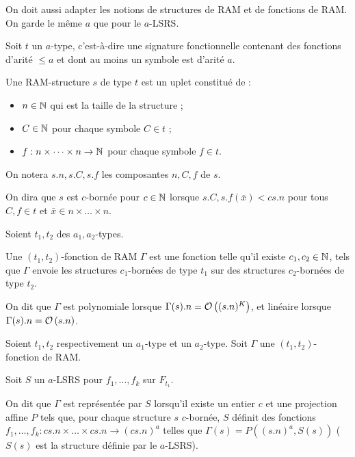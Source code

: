 \documentclass{report}
\begin{document}
		On doit aussi adapter les notions de structures de RAM et de fonctions de RAM. On garde le même $a$ que pour le $a$-LSRS.
		
		\begin{definition}
			\label{def:RAM_data_structures_a}
			Soit $t$ un $a$-type, c'est-à-dire une signature fonctionnelle contenant des fonctions d'arité $\leqslant a$ et dont au moins un symbole est d'arité $a$. 
			
			Une RAM-structure $s$ de type $t$ est un uplet constitué de :
			\begin{itemize}[itemsep=-1mm]
				\item 	$n \in \mathbb{N}$ qui est la taille de la structure ;
				\item 	$C \in \mathbb{N}$ pour chaque symbole $C \in t$ ;
				\item 	$f : n\times \dots \times n \to \mathbb{N}$ pour chaque symbole $f \in t$.
			\end{itemize}
			
			On notera $s.n, s.C, s.f$ les composantes $n, C, f$ de $s$.
			
			On dira que $s$ est $c$-bornée pour $c\in\mathbb{N}$ lorsque $s.C, s.f\left(\bar{x}\right) < c s.n$ pour tous $C, f \in t$ et $\bar{x} \in n\times \dots \times n$.
		\end{definition}
		
		
		\begin{definition}
			\label{def:fonction_de_RAM_a}
			Soient $t_1, t_2$ des $a_1,a_2$-types. 
					
			Une $(t_1, t_2)$-fonction de RAM $\Gamma$ est une fonction telle qu'il existe $c_1, c_2 \in \mathbb{N}$, tels que $\Gamma$ envoie les structures $c_1$-bornées de type $t_1$ sur des structures $c_2$-bornées de type $t_2$\footnotemark.
			
			
			On dit que $\Gamma$ est polynomiale lorsque $\Gamma(s).n = \mathcal{O}\left( (s.n)^K \right)$, et linéaire lorsque $\Gamma(s).n = \mathcal{O}\left( s.n \right)$.
			
		\end{definition}
		
		
		\begin{definition}
			\label{def:representee_par_aLSRS}
			Soient $t_1, t_2$ respectivement un $a_1$-type et un $a_2$-type. Soit $\Gamma$ une $(t_1, t_2)$-fonction de RAM.
			
			Soit $S$ un $a$-LSRS pour $f_1, \dots, f_k$ sur $F_{t_1}$. 
			
			On dit que $\Gamma$ est représentée par $S$ lorsqu'il existe un entier $c$ et une projection affine $P$ tels que, pour chaque structure $s$ $c$-bornée, $S$ définit des fonctions $f_1, \dots, f_k : cs.n \times \dots \times cs.n \to (cs.n)^a$ telles que $\Gamma(s) = P((s.n)^a, S(s))$ ($S(s)$ est la structure définie par le $a$-LSRS).
		\end{definition}
		
\end{document}
